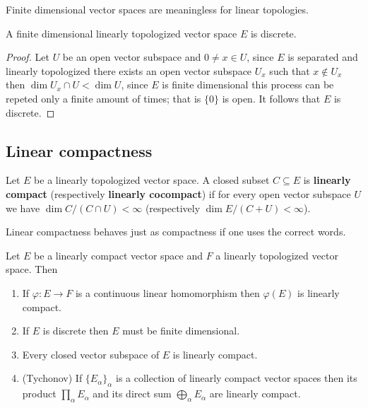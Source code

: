 Finite dimensional vector spaces are meaningless for linear topologies. 
\begin{proposition}\label{finite_dimensional_linear_topologies}
	A finite dimensional linearly topologized vector space $E$ is discrete.
\end{proposition}
\begin{proof}
	Let $U$ be an open vector subspace and $0 \neq x \in U$, since $E$ is separated and linearly topologized there exists an open vector subspace $U_{x}$ such that $x \not\in U_{x}$ then $\dim U_{x} \cap U < \dim U$, since $E$ is finite dimensional this process can be repeted only a finite amount of times; that is $\{0\}$ is open. It follows that $E$ is discrete.
\end{proof}
\subsection*{Linear compactness}
\begin{definition}\label{linear_compactness}
	Let $E$ be a linearly topologized vector space. A closed subset $C \subseteq E$ is \textbf{linearly compact} (respectively \textbf{linearly cocompact}) if for every open vector subspace $U$ we have $\dim C/(C \cap U) < \infty$ (respectively $\dim E/(C+U) < \infty$). 
\end{definition}
Linear compactness behaves just as compactness if one uses the correct words.
\begin{proposition}\label{linear_compactness_properties}
	Let $E$ be a linearly compact vector space and $F$ a linearly topologized vector space. Then
	\begin{enumerate}[label = (\alph*)]
		\item If $\varphi\colon E \to F$ is a continuous linear homomorphism then $\varphi(E)$ is linearly compact.
		\item If $E$ is discrete then $E$ must be finite dimensional.
		\item Every closed vector subspace of $E$ is linearly compact.
		\item (Tychonov) If $\{E_{\alpha}\}_{\alpha}$ is a collection of linearly compact vector spaces then its product $\prod_{\alpha} E_{\alpha}$ and its direct sum $\bigoplus_{\alpha}E_{\alpha}$ are linearly compact.
	\end{enumerate}
\end{proposition}
